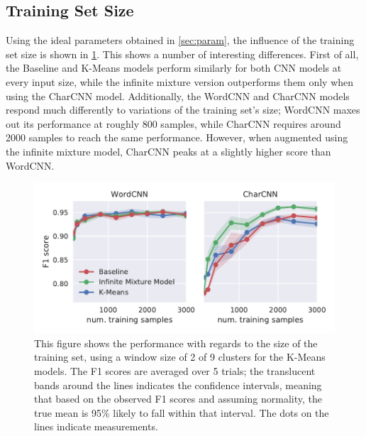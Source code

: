 \subsection{Training Set Size}
Using the ideal parameters obtained in \cref{sec:param}, the influence of the
training set size is shown in \cref{fig:size}. This shows a number of
interesting differences. First of all, the Baseline and K-Means models perform
similarly for both CNN models at every input size, while the infinite mixture
version outperforms them only when using the CharCNN model. Additionally, the
WordCNN and CharCNN models respond much differently to variations of the
training set's size; WordCNN maxes out its performance at roughly 800 samples,
while CharCNN requires around 2000 samples to reach the same performance.
However, when augmented using the infinite mixture model, CharCNN peaks at a
slightly higher score than WordCNN.
\begin{figure}[tb]
  \centering
  \includegraphics[width=\textwidth]{figures/results/training-size-old/tseries_f1.pdf}
  \caption{This figure shows the performance with regards to the size of the
    training set, using a window size of 2 of 9 clusters for the K-Means models.
    The F1 scores are averaged over 5 trials; the translucent bands
    around the lines indicates the confidence intervals, meaning that based on
    the observed F1 scores and assuming normality, the true mean is 95\% likely
    to fall within that interval. The dots on the lines indicate
    measurements.\label{fig:size}}
\end{figure}

\FloatBarrier%

